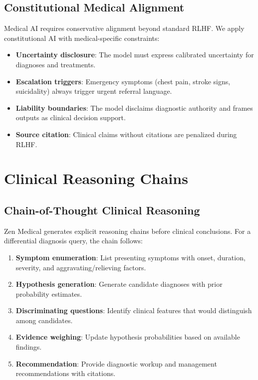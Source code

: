 \documentclass[11pt,a4paper]{article}
\begin{document}
\subsection{Constitutional Medical Alignment}

Medical AI requires conservative alignment beyond standard RLHF. We apply constitutional AI with medical-specific constraints:

\begin{itemize}
  \item \textbf{Uncertainty disclosure}: The model must express calibrated uncertainty for diagnoses and treatments.
  \item \textbf{Escalation triggers}: Emergency symptoms (chest pain, stroke signs, suicidality) always trigger urgent referral language.
  \item \textbf{Liability boundaries}: The model disclaims diagnostic authority and frames outputs as clinical decision support.
  \item \textbf{Source citation}: Clinical claims without citations are penalized during RLHF.
\end{itemize}

\section{Clinical Reasoning Chains}

\subsection{Chain-of-Thought Clinical Reasoning}

Zen Medical generates explicit reasoning chains before clinical conclusions. For a differential diagnosis query, the chain follows:

\begin{enumerate}
  \item \textbf{Symptom enumeration}: List presenting symptoms with onset, duration, severity, and aggravating/relieving factors.
  \item \textbf{Hypothesis generation}: Generate candidate diagnoses with prior probability estimates.
  \item \textbf{Discriminating questions}: Identify clinical features that would distinguish among candidates.
  \item \textbf{Evidence weighing}: Update hypothesis probabilities based on available findings.
  \item \textbf{Recommendation}: Provide diagnostic workup and management recommendations with citations.
\end{enumerate}
\end{document}
